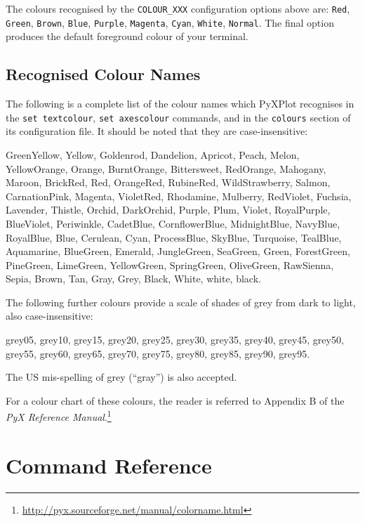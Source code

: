 \documentclass[a4paper,onecolumn,11pt]{book}
\begin{document}
The colours recognised by the \texttt{COLOUR\_XXX} configuration options above are: \texttt{Red}, \texttt{Green}, \texttt{Brown}, \texttt{Blue}, \texttt{Purple}, \texttt{Magenta}, \texttt{Cyan}, \texttt{White}, \texttt{Normal}. The final option produces the default foreground colour of your terminal.

\section{Recognised Colour Names}
\label{colour_names}

The following is a complete list of the colour names which PyXPlot recognises in the \texttt{set textcolour}, \texttt{set axescolour} commands, and in the \texttt{colours} section of its configuration file. It should be noted that they are case-insensitive:

GreenYellow, Yellow, Goldenrod, Dandelion, Apricot, Peach, Melon, YellowOrange, Orange, BurntOrange, Bittersweet, RedOrange, Mahogany, Maroon, BrickRed, Red, OrangeRed, RubineRed, WildStrawberry, Salmon, CarnationPink, Magenta, VioletRed, Rhodamine, Mulberry, RedViolet, Fuchsia, Lavender, Thistle, Orchid, DarkOrchid, Purple, Plum, Violet, RoyalPurple, BlueViolet, Periwinkle, CadetBlue, CornflowerBlue, MidnightBlue, NavyBlue, RoyalBlue, Blue, Cerulean, Cyan, ProcessBlue, SkyBlue, Turquoise, TealBlue, Aquamarine, BlueGreen, Emerald, JungleGreen, SeaGreen, Green, ForestGreen, PineGreen, LimeGreen, YellowGreen, SpringGreen, OliveGreen, RawSienna, Sepia, Brown, Tan, Gray, Grey, Black, White, white, black.

The following further colours provide a scale of shades of grey from dark to light, also case-insensitive:

grey05, grey10, grey15, grey20, grey25, grey30, grey35, grey40, grey45, grey50, grey55, grey60, grey65, grey70, grey75, grey80, grey85, grey90, grey95.

The US mis-spelling of grey (``gray'') is also accepted.

For a colour chart of these colours, the reader is referred to Appendix B of the \textit{PyX Reference Manual}.\footnote{\url{http://pyx.sourceforge.net/manual/colorname.html}}

\chapter{Command Reference}
\end{document}
